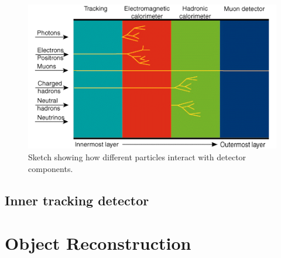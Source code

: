 \begin{figure}
\centering
    \includegraphics[width=1.0\textwidth]{images/Detector_Interactions.png}
    \caption{Sketch showing how different particles interact with detector components.}
    \label{fig:Detector_Interactions}
\end{figure}

\subsection{Inner tracking detector}

\section{Object Reconstruction}